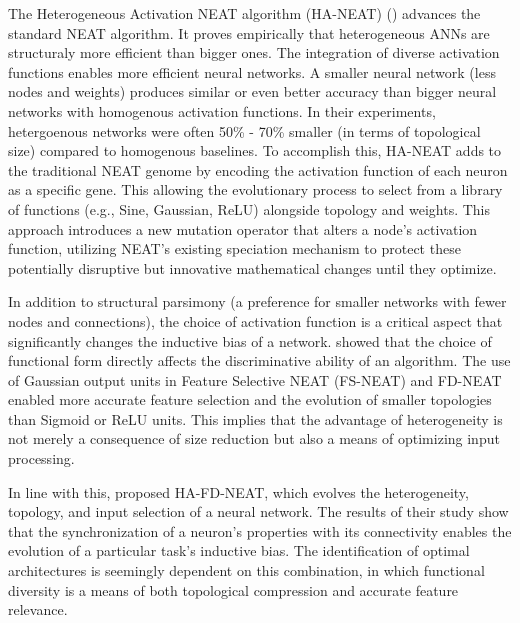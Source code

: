 \documentclass[12pt]{article}
\begin{document}

The Heterogeneous Activation NEAT algorithm (HA-NEAT) (\cite{hagg_evolving_2017}) advances the standard NEAT algorithm. It proves empirically that heterogeneous ANNs are structuraly more efficient than bigger ones. The integration of diverse activation functions enables more efficient neural networks. A smaller neural network (less nodes and weights) produces similar or even better accuracy than bigger neural networks with homogenous activation functions. In their experiments, hetergoenous networks were often 50\% - 70\% smaller (in terms of topological size) compared to homogenous baselines. To accomplish this, HA-NEAT adds to the traditional NEAT genome by encoding the activation function of each neuron as a specific gene. This allowing the evolutionary process to select from a library of functions (e.g., Sine, Gaussian, ReLU) alongside topology and weights. This approach introduces a new mutation operator that alters a node's activation function, utilizing NEAT's existing speciation mechanism to protect these potentially disruptive but innovative mathematical changes until they optimize.

In addition to structural parsimony (a preference for smaller networks with fewer nodes and connections), the choice of activation function is a critical aspect that significantly changes the inductive bias of a network. \cite{papavasileiou_importance_2017} showed that the choice of functional form directly affects the discriminative ability of an algorithm. The use of Gaussian output units in Feature Selective NEAT (FS-NEAT) and FD-NEAT enabled more accurate feature selection and the evolution of smaller topologies than Sigmoid or ReLU units. This implies that the advantage of heterogeneity is not merely a consequence of size reduction but also a means of optimizing input processing.

In line with this, \cite{papavasileiou_optimizing_2022} proposed HA-FD-NEAT, which evolves the heterogeneity, topology, and input selection of a neural network. The results of their study show that the synchronization of a neuron's properties with its connectivity enables the evolution of a particular task's inductive bias. The identification of optimal architectures is seemingly dependent on this combination, in which functional diversity is a means of both topological compression and accurate feature relevance.


\end{document}
